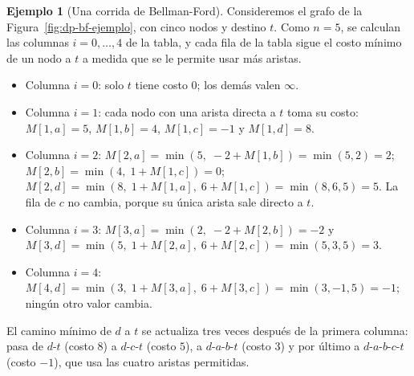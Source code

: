 \documentclass[12pt, spanish, oneside, openany]{book}
\theoremstyle{uprightplain}
\theoremstyle{definition}
\newtheorem{ejemplo}[teorema]{Ejemplo}
\theoremstyle{remark}
\theoremstyle{definition}
\begin{document}
\begin{ejemplo}[Una corrida de Bellman-Ford]
\label{ej:dp-bf}
Consideremos el grafo de la Figura~\ref{fig:dp-bf-ejemplo}, con cinco nodos y destino $t$. Como $n=5$, se calculan las columnas $i=0,\dots,4$ de la tabla, y cada fila de la tabla sigue el costo mínimo de un nodo a $t$ a medida que se le permite usar más aristas.
\begin{itemize}
    \item Columna $i=0$: solo $t$ tiene costo $0$; los demás valen $\infty$.
    \item Columna $i=1$: cada nodo con una arista directa a $t$ toma su costo: $M[1,a]=5$, $M[1,b]=4$, $M[1,c]=-1$ y $M[1,d]=8$.
    \item Columna $i=2$: $M[2,a]=\min(5,\;-2+M[1,b])=\min(5,2)=2$; $M[2,b]=\min(4,\;1+M[1,c])=0$; $M[2,d]=\min(8,\;1+M[1,a],\;6+M[1,c])=\min(8,6,5)=5$. La fila de $c$ no cambia, porque su única arista sale directo a $t$.
    \item Columna $i=3$: $M[3,a]=\min(2,\;-2+M[2,b])=-2$ y $M[3,d]=\min(5,\;1+M[2,a],\;6+M[2,c])=\min(5,3,5)=3$.
    \item Columna $i=4$: $M[4,d]=\min(3,\;1+M[3,a],\;6+M[3,c])=\min(3,-1,5)=-1$; ningún otro valor cambia.
\end{itemize}
El camino mínimo de $d$ a $t$ se actualiza tres veces después de la primera columna: pasa de $d$-$t$ (costo $8$) a $d$-$c$-$t$ (costo $5$), a $d$-$a$-$b$-$t$ (costo $3$) y por último a $d$-$a$-$b$-$c$-$t$ (costo $-1$), que usa las cuatro aristas permitidas.
\end{ejemplo}
\end{document}
